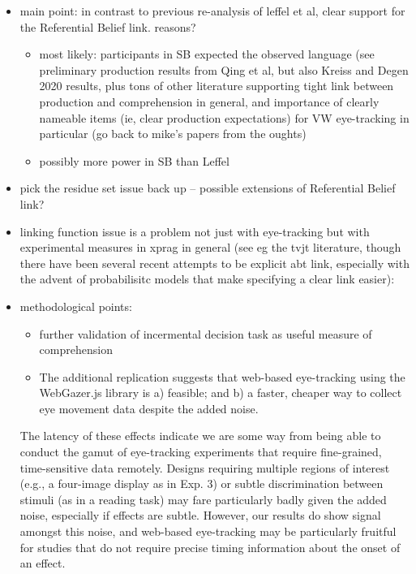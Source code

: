 \documentclass[10pt,letterpaper]{article}
\begin{document}
\begin{itemize}
	\item main point: in contrast to previous re-analysis of leffel et al, clear support for the Referential Belief link. reasons? 
	\begin{itemize}
		\item most likely: participants in SB expected the observed language (see preliminary production results from Qing et al, but also Kreiss and Degen 2020 results, plus tons of other literature supporting tight link between production and comprehension in general, and importance of clearly nameable items (ie, clear production expectations) for VW eye-tracking in particular (go back to mike's papers from the oughts)
		\item possibly more power in SB than Leffel
	\end{itemize}
	\item pick the residue set issue back up -- possible extensions of Referential Belief link?
	\item linking function issue is a problem not just with eye-tracking but with experimental measures in xprag in general (see eg the tvjt literature, though there have been several recent attempts to be explicit abt link, especially with the advent of probabilisitc models that make specifying a clear link easier): \cite{Jasbi2019, WaldonDegen2020, franke2014typical, savinelli2018, franke2016link, scholler2017semantic, tessler2019language}
	\item methodological points:
		\begin{itemize}
			\item further validation of incermental decision task as useful measure of comprehension
			\item The additional replication suggests that web-based eye-tracking using the WebGazer.js library is a) feasible; and b) a faster, cheaper way to collect eye movement data despite the added noise.
		\end{itemize}
		
The latency of these effects indicate we are some way from being able to conduct the gamut of eye-tracking experiments that require fine-grained, time-sensitive data remotely. Designs requiring multiple regions of interest (e.g., a four-image display as in Exp. 3) or subtle discrimination between stimuli (as in a reading task) may fare particularly badly given the added noise, especially if effects are subtle. However, our results do show signal amongst this noise, and web-based eye-tracking may be particularly fruitful for studies that do not require precise timing information about the onset of an effect. 


\end{itemize}
\end{document}
